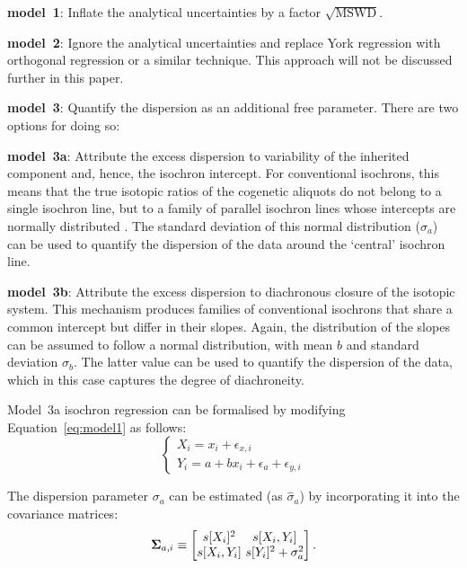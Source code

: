 \documentclass{article}
\begin{document}
\begin{description}
\item{\textbf{model~1}:} Inflate the analytical uncertainties by a
  factor $\sqrt{\mbox{MSWD}}$.
\item{\textbf{model~2}:} Ignore the analytical uncertainties and
  replace York regression with orthogonal regression or a similar
  technique. This approach will not be discussed further in this
  paper.
\item{\textbf{model~3}:} Quantify the dispersion as an additional free
  parameter. There are two options for doing so:
  \begin{description}
  \item{\textbf{model~3a}:} Attribute the excess dispersion to
    variability of the inherited component and, hence, the isochron
    intercept. For conventional isochrons, this means that the true
    isotopic ratios of the cogenetic aliquots do not belong to a
    single isochron line, but to a family of parallel isochron lines
    whose intercepts are normally distributed
    \citep{titterington1979}. The standard deviation of this normal
    distribution ($\sigma_a$) can be used to quantify the dispersion
    of the data around the `central' isochron line.
  \item{\textbf{model~3b}:} Attribute the excess dispersion to
    diachronous closure of the isotopic system. This mechanism
    produces families of conventional isochrons that share a common
    intercept but differ in their slopes. Again, the distribution of
    the slopes can be assumed to follow a normal distribution, with
    mean $b$ and standard deviation $\sigma_b$. The latter value can
    be used to quantify the dispersion of the data, which in this case
    captures the degree of diachroneity.
  \end{description}
\end{description}

Model~3a isochron regression can be formalised by modifying
Equation~\ref{eq:model1} as follows:
\begin{equation}
  \begin{cases}
    X_i = x_i + \epsilon_{x,i} \\
    Y_i = a + b x_i + \epsilon_a + \epsilon_{y,i}
  \end{cases}
  \label{eq:model3a}
\end{equation}

The dispersion parameter $\sigma_a$ can be estimated (as
$\hat{\sigma}_a$) by incorporating it into the covariance matrices:
\begin{equation}
  \mathbf{\Sigma}_{a,i} \equiv
  \left[
    \begin{array}{@{}c@{~}c@{}}
      s[X_i]^2 & s[X_i,Y_i]\\
      s[X_i,Y_i] & s[Y_i]^2 + \sigma_a^2
    \end{array}
    \right].
  \label{eq:model3aEi}
\end{equation}
\end{document}
